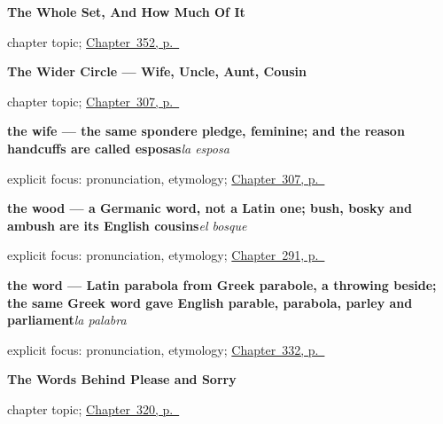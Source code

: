 \noindent\begin{minipage}[t]{\linewidth}
\raggedright
\textbf{The Whole Set, And How Much Of It}\par
\footnotesize chapter topic; \hyperref[ch:el-conjunto-y-el-resto]{Chapter~352, p.~\pageref*{ch:el-conjunto-y-el-resto}}
\end{minipage}\par\smallskip

\noindent\begin{minipage}[t]{\linewidth}
\raggedright
\textbf{The Wider Circle --- Wife, Uncle, Aunt, Cousin}\par
\footnotesize chapter topic; \hyperref[ch:esposos-y-tios]{Chapter~307, p.~\pageref*{ch:esposos-y-tios}}
\end{minipage}\par\smallskip

\noindent\begin{minipage}[t]{\linewidth}
\raggedright
\textbf{the wife --- the same spondere pledge, feminine; and the reason handcuffs are called esposas}\enspace\emph{la esposa}\par
\footnotesize explicit focus: pronunciation, etymology; \hyperref[ch:esposos-y-tios]{Chapter~307, p.~\pageref*{ch:esposos-y-tios}}
\end{minipage}\par\smallskip

\noindent\begin{minipage}[t]{\linewidth}
\raggedright
\textbf{the wood — a Germanic word, not a Latin one; bush, bosky and ambush are its English cousins}\enspace\emph{el bosque}\par
\footnotesize explicit focus: pronunciation, etymology; \hyperref[ch:de-la-semilla]{Chapter~291, p.~\pageref*{ch:de-la-semilla}}
\end{minipage}\par\smallskip

\noindent\begin{minipage}[t]{\linewidth}
\raggedright
\textbf{the word — Latin parabola from Greek parabole, a throwing beside; the same Greek word gave English parable, parabola, parley and parliament}\enspace\emph{la palabra}\par
\footnotesize explicit focus: pronunciation, etymology; \hyperref[ch:permiso-y-voz]{Chapter~332, p.~\pageref*{ch:permiso-y-voz}}
\end{minipage}\par\smallskip

\noindent\begin{minipage}[t]{\linewidth}
\raggedright
\textbf{The Words Behind Please and Sorry}\par
\footnotesize chapter topic; \hyperref[ch:favor-y-culpa]{Chapter~320, p.~\pageref*{ch:favor-y-culpa}}
\end{minipage}\par\smallskip

